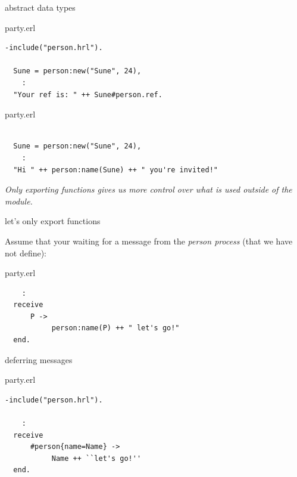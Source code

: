 \begin{frame}[fragile]{abstract data types}


\begin{block}{party.erl}
\begin{verbatim}
-include("person.hrl").

  Sune = person:new("Sune", 24),
    :
  "Your ref is: " ++ Sune#person.ref.
\end{verbatim}
\end{block}

\pause

\begin{block}{party.erl}
\begin{verbatim}

  Sune = person:new("Sune", 24),
    :
  "Hi " ++ person:name(Sune) ++ " you're invited!"

\end{verbatim}
     \end{block}
\pause\vspace{10pt}
{\em Only exporting functions gives us more control over what is used outside of the module.}

\end{frame}

\begin{frame}[fragile]{let's only export functions}

Assume that your waiting for a message from the {\em person process} (that we have not define):

\pause\vspace{20pt}

\begin{block}{party.erl}
\begin{verbatim}
    :
  receive 
      P -> 
           person:name(P) ++ " let's go!"
  end.
\end{verbatim}
     \end{block}

\end{frame}

\begin{frame}[fragile]{deferring messages}


\begin{block}{party.erl}
\begin{verbatim}
-include("person.hrl").
    
    :
  receive 
      #person{name=Name} -> 
           Name ++ ``let's go!''
  end.
\end{verbatim}
\end{block}

\end{frame}

